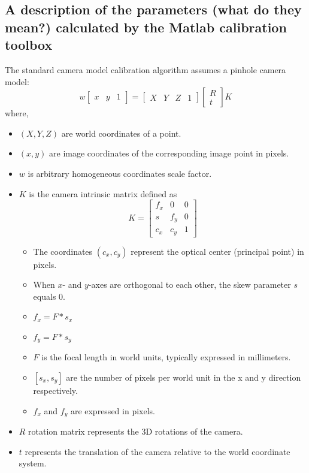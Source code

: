 \subsection{A description of the parameters (what do they mean?) calculated by the Matlab calibration toolbox}
The standard camera model calibration algorithm assumes a pinhole camera model:
\begin{equation}
w \begin{bmatrix} x & y & 1 \end{bmatrix} = \begin{bmatrix} X & Y & Z & 1 \end{bmatrix} \begin{bmatrix} R \\ t \end{bmatrix} K
\end{equation}
where,
\begin{itemize}
\item $(X,Y,Z)$ are world coordinates of a point.
\item $(x,y)$ are image coordinates of the corresponding image point in pixels.
\item $w$ is arbitrary homogeneous coordinates scale factor.
\item $K$ is the camera intrinsic matrix defined as
\begin{equation}
K = \begin{bmatrix}
f_x & 0 & 0 \\
s & f_y & 0 \\
c_x & c_y & 1
\end{bmatrix}
\end{equation} 
\begin{itemize}
\item The coordinates $(c_x, c_y)$ represent the optical center (principal point) in pixels.
\item When $x$- and $y$-axes are orthogonal to each other, the skew parameter $s$ equals $0$.
\item $f_x = F*s_x$
\item $f_y = F*s_y$
\item $F$ is the focal length in world units, typically expressed in millimeters.
\item $[s_x, s_y]$  are the number of pixels per world unit in the x and y direction respectively.
\item $f_x$ and $f_y$ are expressed in pixels.
\end{itemize}
\item $R$ rotation matrix represents the 3D rotations of the camera.
\item $t$ represents the translation of the camera relative to the world coordinate system.
\end{itemize}


